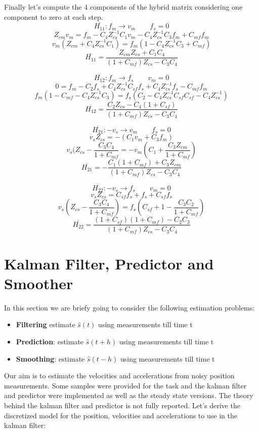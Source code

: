 \documentclass[a4paper,12pt]{article}
\begin{document}
\noindent Finally let's compute the 4 components of the hybrid matrix considering one component to zero at each step.
\[
    \overline{H_{11}} : f_m \rightarrow v_m \qquad f_s = 0
    \]\[
    Z_{cm}v_m = f_m - C_4Z_{cs}^{-1}C_1v_m - C_4Z_{cs}^{-1}C_3f_m + C_{mf}f_m
\]\[
    v_m(Z_{cm}+C_4Z_{cs}^{-1}C_1) = f_m(1-C_4Z_{cs}^{-1}C_3 + C_{mf})
    \]\[
    \overline{H_{11}} = \frac{Z_{cm}Z_{cs}+C_1C_4}{(1+C_{mf})Z_{cs} - C_3C_4}
\]


\bigskip

\[
    \overline{H_{12}} : f_m \rightarrow f_s \qquad v_m = 0
    \]\[
    0 = f_m -C_2f_s +C_4Z_{cs}^{-1}C_{sf}f_s + C_4Z_{cs}^{-1}f_s - C_{mf}f_m
\]\[
    f_m(1-C_{mf}-C_4Z_{cs}^{-1}C_3) = f_s(C_2-C_4Z_{cs}^{-1}C_{sf}C_{sf}-C_4Z_{cs}^{-1})
    \]\[
    \overline{H_{12}} = \frac{C_2Z_{cs}-C_4(1+C_{sf})}{(1+C_{mf})Z_{cs} - C_3C_4}
\]

\bigskip

\[
    \overline{H_{21}} : -v_s \rightarrow v_m \qquad f_s = 0
    \]\[
    v_sZ_{cs} = -(C_1v_m + C_3f_m)
\]\[
    v_s(Z_{cs} - \frac{C_3C_4}{1+C_{mf}} = -v_m(C_1 + \frac{C_3Z_{cm}}{1+C_{mf}})
    \]\[
    \overline{H_{21}} = -\frac{C_1(1+C_{mf}) + C_3Z_{cm}}{(1+C_{mf})Z_{cs} - C_3C_4}
\]


\bigskip

\[
    \overline{H_{22}} : -v_s \rightarrow f_s \qquad v_m = 0
\]\[
    v_sZ_{cs} = C_{sf}f_s + f_s + C_{sf}f_s
\]\[
    v_s(Z_{cs}-\frac{C_3C_4}{1+C_{mf}}) = f_s(C_{sf} + 1 - \frac{C_3C_2}{1+C_{mf}})
\]\[
    \overline{H_{22}} = \frac{(1+C_{sf})(1+C_{mf})-C_2C_3}{(1+C_{mf})Z_{cs}-C_3C_4}
\]

\section{Kalman Filter, Predictor and Smoother}
In this section we are briefy going to consider the following estimation problems:
\begin{itemize}
    \item \textbf{Filtering} estimate $\hat{s}(t)$ using measurements till time t
    \item \textbf{Prediction}: estimate $\hat{s}(t+h)$ using measurements till time t
    \item \textbf{Smoothing}: estimate $\hat{s}(t-h)$ using measurements till time t
\end{itemize}
\bigskip

Our aim is to estimate the velocities and accelerations from noisy position measurements. Some samples were provided for the task and the kalman filter and predictor were implemented as well as the steady state versions. The theory behind the kalman filter and predictor is not fully reported. Let's derive the discretized model for the position, velocities and accelerations to use in the kalman filter:
\end{document}
